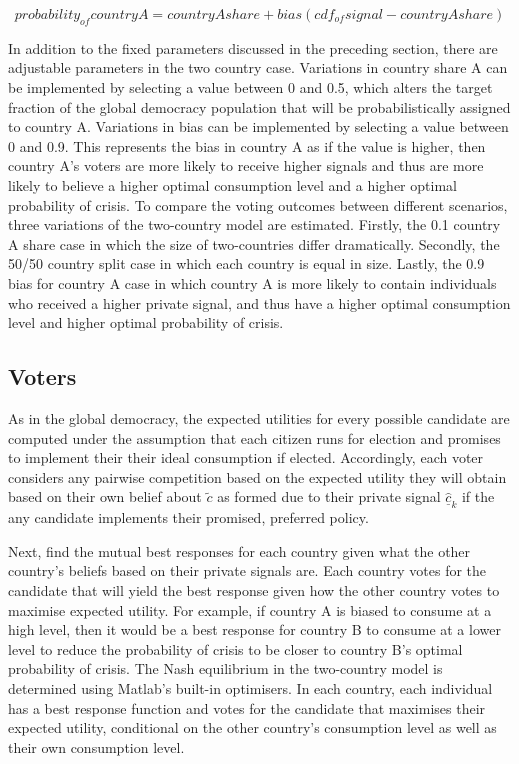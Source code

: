 \documentclass[11pt,preprint, authoryear]{elsarticle}
\numberwithin{equation}{section}
\numberwithin{figure}{section}
\numberwithin{table}{section}
\begin{document}
\[probability_{of}country A = country A share + bias(cdf_{of}signal - country A share)\]

In addition to the fixed parameters discussed in the preceding section,
there are adjustable parameters in the two country case. Variations in
country share A can be implemented by selecting a value between 0 and
0.5, which alters the target fraction of the global democracy population
that will be probabilistically assigned to country A. Variations in bias
can be implemented by selecting a value between 0 and 0.9. This
represents the bias in country A as if the value is higher, then country
A's voters are more likely to receive higher signals and thus are more
likely to believe a higher optimal consumption level and a higher
optimal probability of crisis. To compare the voting outcomes between
different scenarios, three variations of the two-country model are
estimated. Firstly, the 0.1 country A share case in which the size of
two-countries differ dramatically. Secondly, the 50/50 country split
case in which each country is equal in size. Lastly, the 0.9 bias for
country A case in which country A is more likely to contain individuals
who received a higher private signal, and thus have a higher optimal
consumption level and higher optimal probability of crisis.

\hypertarget{voters-1}{%
\subsection*{Voters}\label{voters-1}}

As in the global democracy, the expected utilities for every possible
candidate are computed under the assumption that each citizen runs for
election and promises to implement their their ideal consumption if
elected. Accordingly, each voter considers any pairwise competition
based on the expected utility they will obtain based on their own belief
about \(\tilde{c}\) as formed due to their private signal
\(\hat{\underline{c}}_k\) if the any candidate implements their
promised, preferred policy.

Next, find the mutual best responses for each country given what the
other country's beliefs based on their private signals are. Each country
votes for the candidate that will yield the best response given how the
other country votes to maximise expected utility. For example, if
country A is biased to consume at a high level, then it would be a best
response for country B to consume at a lower level to reduce the
probability of crisis to be closer to country B's optimal probability of
crisis. The Nash equilibrium in the two-country model is determined
using Matlab's built-in optimisers. In each country, each individual has
a best response function and votes for the candidate that maximises
their expected utility, conditional on the other country's consumption
level as well as their own consumption level.
\end{document}
